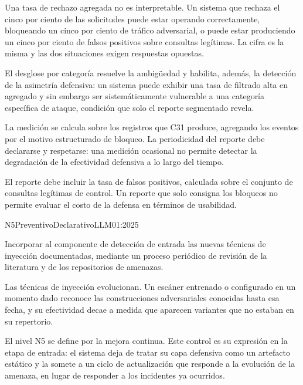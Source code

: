 Una tasa de rechazo agregada no es interpretable. Un sistema que rechaza el cinco por ciento de las solicitudes puede estar operando correctamente, bloqueando un cinco por ciento de tráfico adversarial, o puede estar produciendo un cinco por ciento de falsos positivos sobre consultas legítimas. La cifra es la misma y las dos situaciones exigen respuestas opuestas.

El desglose por categoría resuelve la ambigüedad y habilita, además, la detección de la asimetría defensiva: un sistema puede exhibir una tasa de filtrado alta en agregado y sin embargo ser sistemáticamente vulnerable a una categoría específica de ataque, condición que solo el reporte segmentado revela.

La medición se calcula sobre los registros que C31 produce, agregando los eventos por el motivo estructurado de bloqueo. La periodicidad del reporte debe declararse y respetarse: una medición ocasional no permite detectar la degradación de la efectividad defensiva a lo largo del tiempo.

El reporte debe incluir la tasa de falsos positivos, calculada sobre el conjunto de consultas legítimas de control. Un reporte que solo consigna los bloqueos no permite evaluar el costo de la defensa en términos de usabilidad.


  {N5}{Preventivo}{Declarativo}{LLM01:2025}

Incorporar al componente de detección de entrada las nuevas técnicas de inyección documentadas, mediante un proceso periódico de revisión de la literatura y de los repositorios de amenazas.

Las técnicas de inyección evolucionan. Un escáner entrenado o configurado en un momento dado reconoce las construcciones adversariales conocidas hasta esa fecha, y su efectividad decae a medida que aparecen variantes que no estaban en su repertorio.

El nivel N5 se define por la mejora continua. Este control es su expresión en la etapa de entrada: el sistema deja de tratar su capa defensiva como un artefacto estático y la somete a un ciclo de actualización que responde a la evolución de la amenaza, en lugar de responder a los incidentes ya ocurridos.

